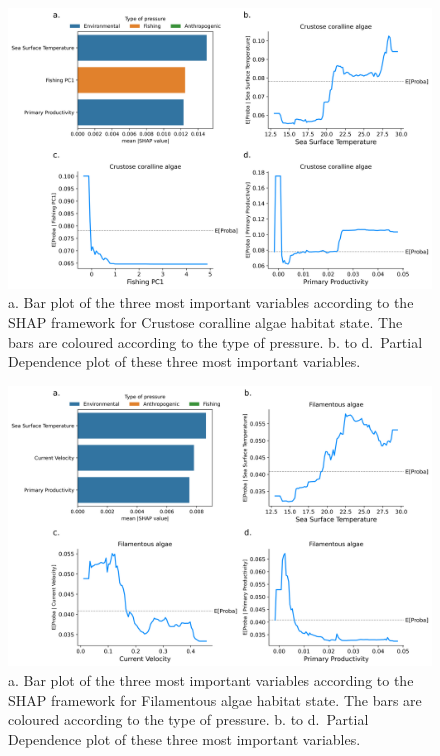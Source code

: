 \begin{figure}
\hypertarget{fig:chap3figS41}{%
\centering
\includegraphics{03-Chapitre3/figures/supplementary/04-pdp_Crustose coralline algae.png}
\caption{a. Bar plot of the three most important variables according to
the SHAP framework for Crustose coralline algae habitat state. The bars
are coloured according to the type of pressure. b. to d.~Partial
Dependence plot of these three most important
variables.}\label{fig:chap3figS41}
}
\end{figure}

\begin{figure}
\hypertarget{fig:chap3figS42}{%
\centering
\includegraphics{03-Chapitre3/figures/supplementary/04-pdp_Filamentous algae.png}
\caption{a. Bar plot of the three most important variables according to
the SHAP framework for Filamentous algae habitat state. The bars are
coloured according to the type of pressure. b. to d.~Partial Dependence
plot of these three most important variables.}\label{fig:chap3figS42}
}
\end{figure}

